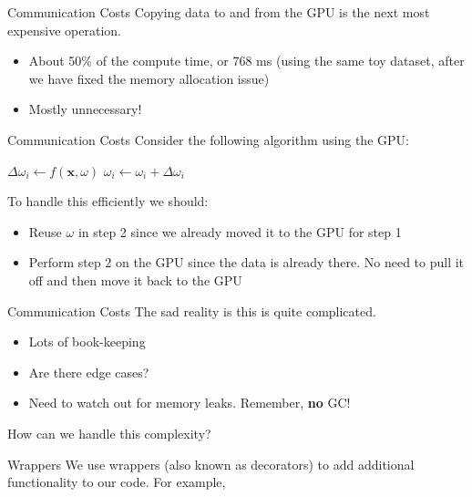 \documentclass{beamer}
\begin{document}
\begin{frame}{Communication Costs}
  Copying data to and from the GPU is the next most expensive operation.
  \begin{itemize}
    \item About 50\% of the compute time, or 768 ms (using the same toy dataset,
      after we have fixed the memory allocation issue) \pause
    \item Mostly unnecessary!
  \end{itemize}
\end{frame}

\begin{frame}{Communication Costs}
  Consider the following algorithm using the GPU:
  \begin{algorithmic}[1]
    \State $\Delta \omega_i \gets f(\mathbf{x}, \omega)$
    \State $\omega_i \gets \omega_i + \Delta \omega_i$
  \end{algorithmic}
  
  To handle this efficiently we should:
  \begin{itemize}
      \pause
    \item Reuse $\omega$ in step 2 since we already moved it to the GPU for step
      1 \pause
    \item Perform step 2 on the GPU since the data is already there. No need to
      pull it off and then move it back to the GPU
  \end{itemize}
\end{frame}

\begin{frame}{Communication Costs}
  The sad reality is this is quite complicated.

  \begin{itemize}
    \item Lots of book-keeping
    \item Are there edge cases?
    \item Need to watch out for memory leaks. Remember, \textbf{no} GC!
  \end{itemize}
\end{frame}

\begin{frame}[standout]
  How can we handle this complexity?
\end{frame}

\begin{frame}{Wrappers}
  We use wrappers (also known as decorators) to add additional functionality to
  our code. For example,
\end{frame}
\end{document}
